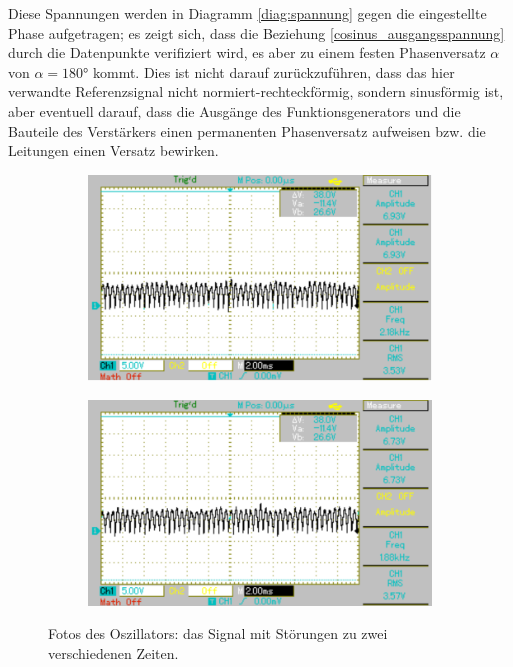 Diese Spannungen werden in Diagramm \ref{diag:spannung} gegen die eingestellte Phase aufgetragen; 
es zeigt sich, dass die Beziehung \eqref{cosinus_ausgangsspannung} durch die Datenpunkte verifiziert wird, es aber zu einem festen Phasenversatz $\alpha$ von $\alpha=180°$ kommt.
Dies ist nicht darauf zurückzuführen, dass das hier verwandte Referenzsignal nicht normiert-rechteckförmig, sondern sinusförmig ist, 
aber eventuell darauf, dass die Ausgänge des Funktionsgenerators und die Bauteile des Verstärkers einen permanenten Phasenversatz aufweisen bzw. die Leitungen einen Versatz bewirken.
\begin{figure}[htb]
	\centering
	\begin{subfigure}{0.49\textwidth}
		\includegraphics[width=\textwidth]{Bilder/MAP002.pdf}
	\end{subfigure}
	\begin{subfigure}{0.49\textwidth}
		\includegraphics[width=\textwidth]{Bilder/MAP003.pdf}
	\end{subfigure}
	\caption{Fotos des Oszillators: das Signal mit Störungen zu zwei verschiedenen Zeiten. \cite{gimp}}
	\label{fig:stoerung}
\end{figure}
